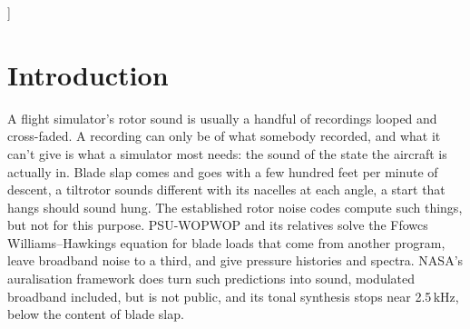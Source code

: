 \documentclass[10pt,a4paper,twocolumn]{article}
\begin{document}
\begin{@twocolumnfalse}
\begin{abstract}
mean error of \NHtMapMean\,dB and a scatter of \NHtMapRms\,dB over the microphones' plane, with both of its lobes. In a recording made behind the pilots of an MV-22B in
cruise, whose camera's gain and response are unknown, the model at equal loudness is within \NMvBand\,dB in every octave-wide band from 50\,Hz to
12\,kHz, though several of its parameters were measured from that recording. Building this programme of tests found a dimensional error
in the blades' pitching moment, a missing propeller moment, a trim that failed in silence, a calibration aimed at the wrong quantity and a published check of a cabin's doors that
turned out to be a measuring artefact; all are corrected or withdrawn here, and are listed. Deficiencies are quantified: the UH-60A's rotors' power at high speed is \NUhLevelAHi\,\% from its flight test; the
Bo~105's collective stands \NBoThMin--\NBoThMax$^\circ$ under NASA's; the UH-60A's level stays flat with speed where the FAA's rises \NFlTestRise\,dB, stands \NFlAppMean\,dB over in approaches, and falls \NFlSideLo{} to \NFlSideHi\,dB short beside the flight path; the UH-60A's cockpit, its drive measured from one calibrated spectrum, runs \NCkNasaMean\,dB over NASA's levels, though within \NCkNasaSd\,dB of their trend with speed, and the measurements themselves differ by 8\,dB; and the MV-22B's cabin paths remain estimates fitted to a single flight.
\end{abstract}
\vspace{6pt}
\end{@twocolumnfalse}
]

\section{Introduction}
A flight simulator's rotor sound is usually a handful of recordings looped and cross-faded. A recording can only be of what somebody recorded, and
what it can't give is what a simulator most needs: the sound of the state the aircraft is actually in. Blade slap comes and goes with a few hundred feet per minute of descent, a tiltrotor sounds
different with its nacelles at each angle, a start that hangs should sound hung. The established rotor noise codes compute such things, but not for this purpose. PSU-WOPWOP and its relatives solve the
Ffowcs Williams--Hawkings equation for blade loads that come from another program, leave broadband noise to a third, and give pressure histories and spectra. NASA's auralisation
framework does turn such predictions into sound, modulated broadband included, but is not public, and its tonal synthesis stops near 2.5\,kHz, below the content of blade slap.
\end{document}
